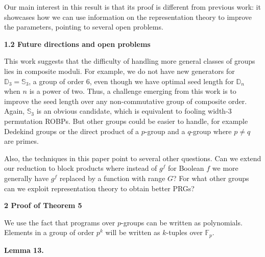 \documentclass[10pt,a4paper]{article}
\begin{document}
Our main interest in this result is that its proof is different from
previous work: it showcases how we can use information on the representation
theory to improve the parameters, pointing to several open problems.\par






\par\medskip\noindent\textbf{
1.2 Future directions and open problems}\par




This work suggests that the difficulty of handling more general classes
of groups lies in composite moduli. For example, we do not have new
generators for $\mathbb{D}_{3}=\mathbb{S}_{3}$, a group of order $6$, even though
we have optimal seed length for $\mathbb{D}_{n}$ when $n$ is a power of two. Thus, a challenge emerging from this work is to improve the seed length over any non-commutative group of composite order. Again, $\mathbb{S}_{3}$ is an obvious candidate, which is equivalent to fooling
width-3 permutation ROBPs. But other groups could be easier to handle,
for example Dedekind groups or the direct product
of a $p$-group and a $q$-group where $p\neq q$ are primes.\par




Also, the techniques in this paper point to several other questions.
Can we extend our reduction to block products where instead of $g^{f}$ for Boolean $f$ we more generally have $g^{f}$ replaced by a function with range $G$? For what other groups can we exploit representation theory to obtain better PRGs?\par






\par\medskip\noindent\textbf{
2 Proof of Theorem 5
}\par




We use the fact that programs over $p$-groups can be written as polynomials.
Elements in a group of order $p^{k}$ will be written as $k$-tuples
over $\mathbb{F}_{p}$.\par





\par\medskip\noindent\textbf{
\textbf{Lemma 13}\textbf{.}
}\par
\end{document}
